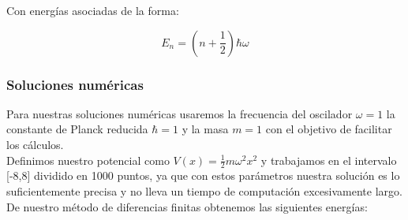 \documentclass[12pt]{article}
\begin{document}
    Con energías asociadas de la forma:
    
    \begin{equation}
        \boxed{E_n=\left(n+\frac{1}{2}\right)\hbar \omega }
    \end{equation}

    \subsubsection{Soluciones numéricas}
    
    Para nuestras soluciones numéricas usaremos la frecuencia del oscilador $\omega=1$ la constante de Planck reducida $\hbar=1$ y la masa $m=1$ con el objetivo de facilitar los cálculos.\\
    
    Definimos nuestro potencial como $V(x)=\frac{1}{2}m\omega^2x^2$ y trabajamos en el intervalo [-8,8] dividido en 1000 puntos, ya que con estos parámetros nuestra solución es lo suficientemente precisa y no lleva un tiempo de computación excesivamente largo.\\

    \newpage
    De nuestro método de diferencias finitas obtenemos las siguientes energías:\\
    
\end{document}
